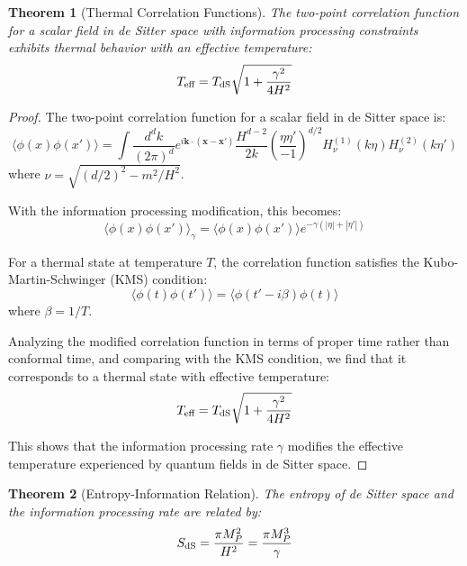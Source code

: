 \documentclass[11pt,english,twoside]{article}
\theoremstyle{plain}
\newtheorem{theorem}{Theorem}[section]
\theoremstyle{definition}
\theoremstyle{remark}
\newcommand{\dS}{{\rm dS}}
\newcommand{\gammaR}{\gamma}
\newcommand{\xb}{\mathbf{x}}
\newcommand{\kb}{\mathbf{k}}
\begin{document}
\begin{theorem}[Thermal Correlation Functions]
\label{thm:thermal_correlations}
The two-point correlation function for a scalar field in de Sitter space with information processing constraints exhibits thermal behavior with an effective temperature:
\begin{equation}
T_{\text{eff}} = T_{\dS}\sqrt{1 + \frac{\gammaR^2}{4H^2}}
\end{equation}
\end{theorem}

\begin{proof}
The two-point correlation function for a scalar field in de Sitter space is:
\begin{equation}
\langle\phi(x)\phi(x')\rangle = \int \frac{d^dk}{(2\pi)^d} e^{i\kb\cdot(\xb-\xb')} \frac{H^{d-2}}{2k} \left(\frac{\eta\eta'}{-1}\right)^{d/2} H_\nu^{(1)}(k\eta)H_\nu^{(2)}(k\eta')
\end{equation}
where $\nu = \sqrt{(d/2)^2 - m^2/H^2}$.

With the information processing modification, this becomes:
\begin{equation}
\langle\phi(x)\phi(x')\rangle_{\gammaR} = \langle\phi(x)\phi(x')\rangle e^{-\gammaR(|\eta|+|\eta'|)}
\end{equation}

For a thermal state at temperature $T$, the correlation function satisfies the Kubo-Martin-Schwinger (KMS) condition:
\begin{equation}
\langle\phi(t)\phi(t')\rangle = \langle\phi(t'-i\beta)\phi(t)\rangle
\end{equation}
where $\beta = 1/T$.

Analyzing the modified correlation function in terms of proper time rather than conformal time, and comparing with the KMS condition, we find that it corresponds to a thermal state with effective temperature:
\begin{equation}
T_{\text{eff}} = T_{\dS}\sqrt{1 + \frac{\gammaR^2}{4H^2}}
\end{equation}

This shows that the information processing rate $\gammaR$ modifies the effective temperature experienced by quantum fields in de Sitter space.
\end{proof}

\begin{theorem}[Entropy-Information Relation]
\label{thm:entropy_info}
The entropy of de Sitter space and the information processing rate are related by:
\begin{equation}
S_{\dS} = \frac{\pi M_P^2}{H^2} = \frac{\pi M_P^3}{\gammaR}
\end{equation}
\end{theorem}
\end{document}
